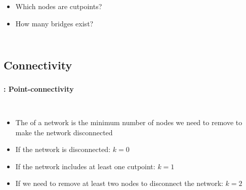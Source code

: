 \documentclass[8pt]{beamer}
\begin{document}
\begin{frame}
\begin{columns}
\begin{itemize}
\item Which nodes are cutpoints?\\
\item How many bridges exist?
\end{itemize}  

\end{columns}

\end{frame}


\subsection{Connectivity}

\begin{frame}
\frametitle{\insertsection}
\framesubtitle{\insertsubsection: Point-connectivity}

\begin{columns}[c]

\begin{minipage}[c][.5\textheight][c]{\linewidth}

\begin{itemize}[<+->]
	\item The {\color{blue}{point-connectivity}} of a network is the minimum number of nodes we need to remove to make the network disconnected
	\item If the network is disconnected: $k=0$
	\item If the network includes at least one cutpoint: $k=1$
	\item If we need to remove at least two nodes to disconnect the network: $k=2$
\end{itemize}

\end{minipage}	   



\end{columns}
\end{frame}
\end{document}
